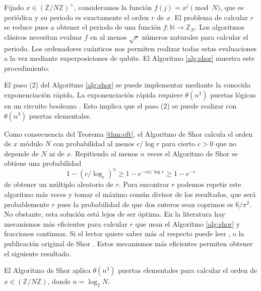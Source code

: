 \documentclass{article}
\begin{document}
Fijado $x \in \left(\mathbb{Z} / N \mathbb{Z}\right)^\times$, consideramos la función $f(j) = x^j \pmod{N}$, que es periódica y su periodo es exactamente el orden $r$ de $x$. El problema de calcular $r$ se reduce pues a obtener el periodo de una función $f \colon \mathbb{N} \to \mathbb{Z}_N$. Los algoritmos clásicos necesitan evaluar $f$ en al menos $\sqrt{r}$ números naturales para calcular el periodo. Los ordenadores cuánticos nos permiten realizar todas estas evaluaciones a la vez mediante superposiciones de qubits. El Algoritmo \ref{alg:shor} muestra este procedimiento.

El paso (2) del Algoritmo \ref{alg:shor} se puede implementar mediante la conocida exponenciación rápida. La exponenciación rápida requiere $\theta(n^3)$ puertas lógicas en un circuito booleano \cite[Sección 5.3]{nielsen}. Esto implica que el paso (2) se puede realizar con $\theta(n^3)$ puertas elementales.

Como consecuencia del Teorema \ref{thm:qft}, el Algoritmo de Shor calcula el orden de $x$ módulo $N$ con probabilidad al menos $c / \log r$ para cierto $c > 0$ que no depende de $N$ ni de $x$. Repitiendo al menos $n$ veces el Algoritmo de Shor se obtiene una probabilidad 
\[1 - (c / \log_r)^n \ge 1 - e^{-c n / \log r} \ge 1-e^{-c} \] 
de obtener un múltiplo aleatorio de $r$. Para encontrar $r$ podemos repetir este algoritmo más veces y tomar el máximo común divisor de los resultados, que será probablemente $r$ pues la probabilidad de que dos enteros sean coprimos es $6 / \pi^2$. No obstante, esta solución está lejos de ser óptima. En la literatura hay mecanismos más eficientes para calcular $r$ que usan el Algoritmo \ref{alg:shor} y fracciones continuas. Si el lector quiere saber más al respecto puede leer \cite[Capítulo 5]{nielsen}, \cite[Capítulo 10]{arora} o la publicación original de Shor \cite{shor}. Estos mecanismos más eficientes permiten obtener el siguiente resultado.

\begin{theorem}
  El Algoritmo de Shor aplica $\theta(n^3)$ puertas elementales para calcular el orden de $x \in \left(\mathbb{Z}/N\mathbb{Z}\right)$, donde $n = \log_2 N$.
\end{theorem}
\end{document}
